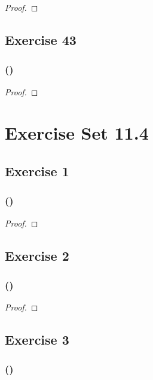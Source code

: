 \documentclass[14pt]{extarticle}
\begin{document}
\begin{proof}

\end{proof}

\subsection{Exercise 43}

\subsubsection{()}

\begin{proof}

\end{proof}

\section{Exercise Set 11.4}

\subsection{Exercise 1}

\subsubsection{()}

\begin{proof}

\end{proof}

\subsection{Exercise 2}

\subsubsection{()}

\begin{proof}

\end{proof}

\subsection{Exercise 3}

\subsubsection{()}
\end{document}
